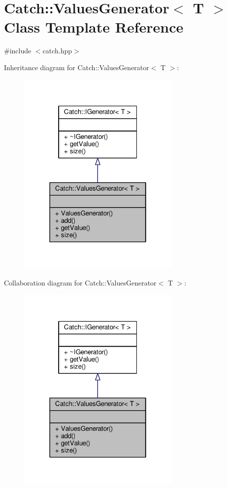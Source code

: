 \hypertarget{class_catch_1_1_values_generator}{\section{Catch\-:\-:Values\-Generator$<$ T $>$ Class Template Reference}
\label{class_catch_1_1_values_generator}
}


{\ttfamily \#include $<$catch.\-hpp$>$}



Inheritance diagram for Catch\-:\-:Values\-Generator$<$ T $>$\-:
\nopagebreak
\begin{figure}[H]
\begin{center}
\leavevmode
\includegraphics[width=226pt]{class_catch_1_1_values_generator__inherit__graph}
\end{center}
\end{figure}


Collaboration diagram for Catch\-:\-:Values\-Generator$<$ T $>$\-:
\nopagebreak
\begin{figure}[H]
\begin{center}
\leavevmode
\includegraphics[width=226pt]{class_catch_1_1_values_generator__coll__graph}
\end{center}
\end{figure}
